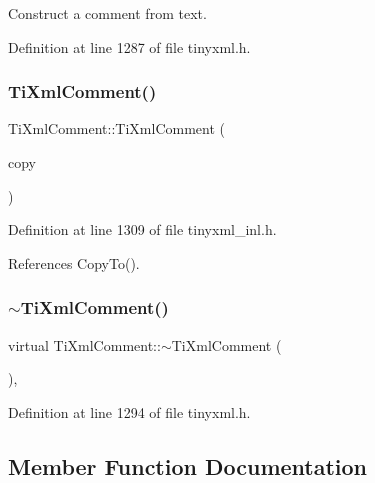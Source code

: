 Construct a comment from text. 



Definition at line 1287 of file tinyxml.\+h.

\hypertarget{class_ti_xml_comment_afaec41ac2760ce946ba1590eb5708e50}{}\label{class_ti_xml_comment_afaec41ac2760ce946ba1590eb5708e50} 
\subsubsection{\texorpdfstring{Ti\+Xml\+Comment()}{TiXmlComment()}\hspace{0.1cm}{\footnotesize\ttfamily [3/3]}}
{\footnotesize\ttfamily Ti\+Xml\+Comment\+::\+Ti\+Xml\+Comment (\begin{DoxyParamCaption}\item[{const \hyperlink{class_ti_xml_comment}{Ti\+Xml\+Comment} \&}]{copy }\end{DoxyParamCaption})}



Definition at line 1309 of file tinyxml\+\_\+inl.\+h.



References Copy\+To().

\hypertarget{class_ti_xml_comment_a3264ae2e9c4a127edfa03289bb2c9aa2}{}\label{class_ti_xml_comment_a3264ae2e9c4a127edfa03289bb2c9aa2} 
\subsubsection{\texorpdfstring{$\sim$\+Ti\+Xml\+Comment()}{~TiXmlComment()}}
{\footnotesize\ttfamily virtual Ti\+Xml\+Comment\+::$\sim$\+Ti\+Xml\+Comment (\begin{DoxyParamCaption}{ }\end{DoxyParamCaption})\hspace{0.3cm}{\ttfamily [inline]}, {\ttfamily [virtual]}}



Definition at line 1294 of file tinyxml.\+h.



\subsection{Member Function Documentation}
\hypertarget{class_ti_xml_comment_ac894241530d1d266131a5026cb251a95}{}\label{class_ti_xml_comment_ac894241530d1d266131a5026cb251a95} 
